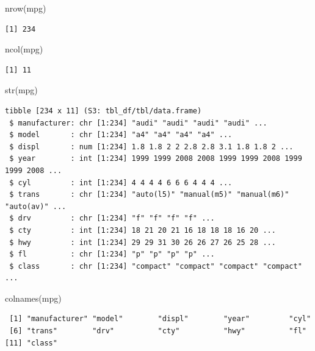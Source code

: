 \documentclass[
  letterpaper,
  DIV=11,
  numbers=noendperiod]{scrreprt}
\newenvironment{Shaded}{\begin{snugshade}}{\end{snugshade}}
\newcommand{\FunctionTok}[1]{\textcolor[rgb]{0.28,0.35,0.67}{#1}}
\newcommand{\NormalTok}[1]{\textcolor[rgb]{0.00,0.23,0.31}{#1}}
\begin{document}
\begin{Shaded}
\begin{Highlighting}[]
\FunctionTok{nrow}\NormalTok{(mpg)}
\end{Highlighting}
\end{Shaded}

\begin{verbatim}
[1] 234
\end{verbatim}

\begin{Shaded}
\begin{Highlighting}[]
\FunctionTok{ncol}\NormalTok{(mpg)}
\end{Highlighting}
\end{Shaded}

\begin{verbatim}
[1] 11
\end{verbatim}

\begin{Shaded}
\begin{Highlighting}[]
\FunctionTok{str}\NormalTok{(mpg)}
\end{Highlighting}
\end{Shaded}

\begin{verbatim}
tibble [234 x 11] (S3: tbl_df/tbl/data.frame)
 $ manufacturer: chr [1:234] "audi" "audi" "audi" "audi" ...
 $ model       : chr [1:234] "a4" "a4" "a4" "a4" ...
 $ displ       : num [1:234] 1.8 1.8 2 2 2.8 2.8 3.1 1.8 1.8 2 ...
 $ year        : int [1:234] 1999 1999 2008 2008 1999 1999 2008 1999 1999 2008 ...
 $ cyl         : int [1:234] 4 4 4 4 6 6 6 4 4 4 ...
 $ trans       : chr [1:234] "auto(l5)" "manual(m5)" "manual(m6)" "auto(av)" ...
 $ drv         : chr [1:234] "f" "f" "f" "f" ...
 $ cty         : int [1:234] 18 21 20 21 16 18 18 18 16 20 ...
 $ hwy         : int [1:234] 29 29 31 30 26 26 27 26 25 28 ...
 $ fl          : chr [1:234] "p" "p" "p" "p" ...
 $ class       : chr [1:234] "compact" "compact" "compact" "compact" ...
\end{verbatim}

\begin{Shaded}
\begin{Highlighting}[]
\FunctionTok{colnames}\NormalTok{(mpg)}
\end{Highlighting}
\end{Shaded}

\begin{verbatim}
 [1] "manufacturer" "model"        "displ"        "year"         "cyl"         
 [6] "trans"        "drv"          "cty"          "hwy"          "fl"          
[11] "class"       
\end{verbatim}
\end{document}
